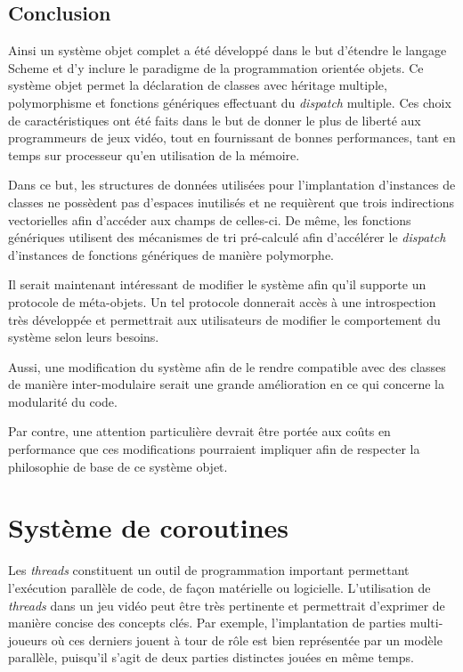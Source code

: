 \documentclass[12pt,twoside,letterpaper,francais]{book}
\begin{document}
\FloatBarrier
\section{Conclusion}
Ainsi un système objet complet a été développé dans le but d'étendre
le langage Scheme et d'y inclure le paradigme de la programmation
orientée objets. Ce système objet permet la déclaration de classes avec
héritage multiple, polymorphisme et fonctions génériques effectuant du
\textit{dispatch} multiple. Ces choix de caractéristiques ont été
faits dans le but de donner le plus de liberté aux programmeurs de
jeux vidéo, tout en fournissant de bonnes performances, tant en temps
sur processeur qu'en utilisation de la mémoire.

Dans ce but, les structures de données utilisées pour l'implantation
d'instances de classes ne possèdent pas d'espaces inutilisés et ne
requièrent que trois indirections vectorielles afin d'accéder aux
champs de celles-ci. De même, les fonctions génériques utilisent des
mécanismes de tri pré-calculé afin d'accélérer le \textit{dispatch}
d'instances de fonctions génériques de manière polymorphe.

Il serait maintenant intéressant de modifier le système afin qu'il
supporte un protocole de méta-objets. Un tel protocole donnerait accès
à une introspection très développée et permettrait aux utilisateurs de
modifier le comportement du système selon leurs besoins.

Aussi, une modification du système afin de le rendre compatible avec
des classes de manière inter-modulaire serait une grande amélioration
en ce qui concerne la modularité du code.

Par contre, une attention particulière devrait être portée aux coûts
en performance que ces modifications pourraient impliquer afin de
respecter la philosophie de base de ce système objet.

\clearpage

\chapter{Système de coroutines} \label{Chap:corout}
Les \textit{threads} constituent un outil de programmation important
permettant l'exécution parallèle de code, de façon matérielle ou
logicielle. L'utilisation de \textit{threads} dans un jeu vidéo peut
être très pertinente et permettrait d'exprimer de manière concise des
concepts clés. Par exemple, l'implantation de parties multi-joueurs où
ces derniers jouent à tour de rôle est bien représentée par un modèle
parallèle, puisqu'il s'agit de deux parties distinctes jouées en même
temps.
\end{document}
